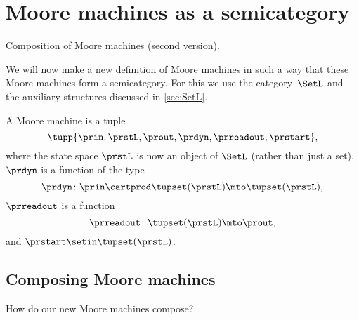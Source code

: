 
\section{Moore machines as a semicategory}
\label{sec:moore-semicategorically}

\begin{marginfigure}
    \centering
    \caption{Composition of Moore machines (second version).}
    \label{fig:comp_moore_2}
\end{marginfigure}

We will now make a new definition of Moore machines in such a way that these Moore machines form a semicategory.
For this we use the category~$\SetL$ and the auxiliary structures discussed in \cref{sec:SetL}.

\begin{definition}
    \label{def:moore_machine}
    A Moore machine is a tuple
    \begin{equation}
        \label{eq:moore-tuple-improved}
        \tupp{\prin,\prstL,\prout,\prdyn,\prreadout,\prstart},
    \end{equation}
    where the state space $\prstL$ is now an object of $\SetL$ (rather than just a set), $\prdyn$ is a function of the type
    \begin{equation}
        \prdyn \colon \prin \cartprod \tupset(\prstL) \mto \tupset(\prstL),
    \end{equation}
    $\prreadout$ is a function
    \begin{equation}
        \prreadout \colon \tupset(\prstL) \mto \prout,
    \end{equation}
    and $\prstart \setin \tupset(\prstL)$.
\end{definition}

\subsection{Composing Moore machines}
\label{sec:composing-moore-machines}

How do our new Moore machines compose?

